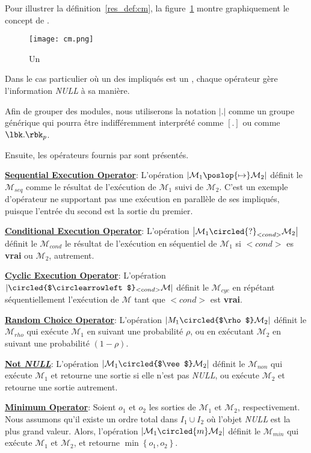 Pour illustrer la définition~\ref{res_def:cm}, la figure~\ref{res_fig:cm} montre graphiquement le concept de \cm.
\begin{figure}
	\centering
	\texttt{[image: cm.png]} %
	\caption[]{Un \cm}
	\label{res_fig:cm}
\end{figure}%

Dans le  cas particulier  où un  des \cms{}  impliqués est  un \opch{}, chaque opérateur gère l'information {\it NULL} à sa manière.

Afin   de  grouper   des   modules,  nous   utiliserons  la   notation $\left|.\right|$ comme un groupe générique qui pourra être indifféremment interprété comme $[.]$ ou comme $\lbk . \rbk_p$.

Ensuite, les opérateurs fournis par \posl{} sont présentés. 

\underline{\bf Sequential Execution Operator}: L'opération $\left|\mathcal{M}_1\poslop{\mapsto}\mathcal{M}_2\right|$ définit le \cm{} $\mathcal{M}_{seq}$ comme le résultat de l'exécution de $\mathcal{M}_1$ suivi de $\mathcal{M}_2$. C'est un exemple d'opérateur ne  supportant pas une exécution en parallèle de ses \cms{} impliqués, puisque l'entrée du second \cm{} est la sortie du premier.

\underline{\bf Conditional Execution Operator}: L'opération $\left|\mathcal{M}_1\circled{?}_{<cond>}\mathcal{M}_2\right|$ définit le \cm{} $\mathcal{M}_{cond}$ le résultat de l'exécution en séquentiel de $\mathcal{M}_1$ si $<cond>$ es {\bf vrai} ou $\mathcal{M}_2$, autrement.

\underline{\bf Cyclic Execution Operator}: L'opération $\left|\circled{$\circlearrowleft$}_{<cond>}\mathcal{M}\right|$ définit le \cm{} $\mathcal{M}_{cyc}$ en répétant séquentiellement l'exécution de $\mathcal{M}$ tant que $<cond>$ est {\bf vrai}.

\underline{\bf Random Choice Operator}: L'opération $\left|M_1\circled{$\rho$}\mathcal{M}_2\right|$ définit le \cm{} $\mathcal{M}_{rho}$ qui exécute $\mathcal{M}_1$ en suivant une probabilité $\rho$, ou en exécutant $\mathcal{M}_2$ en suivant une probabilité $(1-\rho)$.

\underline{\bf Not {\it NULL}}: L'opération $\left|\mathcal{M}_1\circled{$\vee$}\mathcal{M}_2\right|$ définit le \cm{} $\mathcal{M}_{non}$ qui exécute $\mathcal{M}_1$ et retourne une sortie si elle n'est pas {\it NULL}, ou exécute $\mathcal{M}_2$ et retourne une sortie autrement.

\underline{\bf Minimum Operator}: Soient $o_1$ et $o_2$ les sorties de $\mathcal{M}_1$ et $\mathcal{M}_2$, respectivement. Nous assumons qu'il existe un ordre total dans $I_1 \cup I_2$ où l'objet \emph{NULL} est la plus grand valeur. Alors, l'opération $\left|\mathcal{M}_1\circled{m}\mathcal{M}_2\right|$ définit le \cm{} $\mathcal{M}_{min}$ qui exécute $\mathcal{M}_1$ et $\mathcal{M}_2$, et retourne $\min\left\{o_1,o_2\right\}$.

